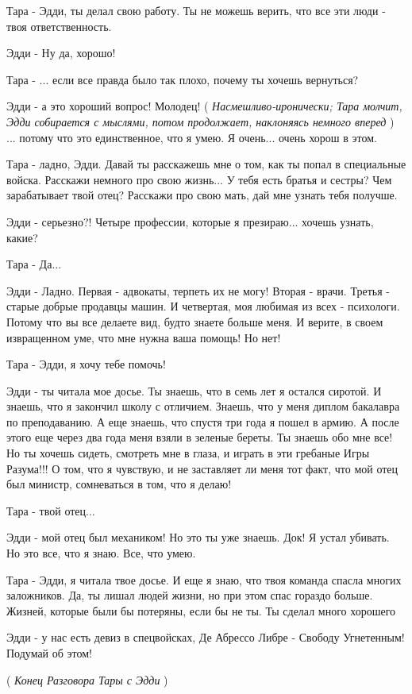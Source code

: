 Тара - Эдди, ты делал свою работу. Ты не можешь верить, что все эти люди - твоя
ответственность.

Эдди - Ну да, хорошо!

Тара - ... если все правда было так плохо, почему ты хочешь вернуться? 

Эдди - а это хороший вопрос! Молодец! ( \emph{Насмешливо-иронически; Тара
молчит, Эдди собирается с мыслями, потом продолжает, наклоняясь немного вперед}
) ... потому что это единственное, что я умею. Я очень...  очень хорош в этом. 

Тара - ладно, Эдди. Давай ты расскажешь мне о том, как ты попал в специальные
войска. Расскажи немного про свою жизнь... У тебя есть братья и сестры? Чем
зарабатывает твой отец? Расскажи про свою мать, дай мне узнать тебя получше. 

Эдди - серьезно?!  Четыре профессии, которые я презираю... хочешь узнать, какие?

Тара - Да...
 
Эдди - Ладно. Первая - адвокаты, терпеть их не могу! Вторая - врачи. Третья -
старые добрые продавцы машин.  И четвертая, моя любимая из всех - психологи.
Потому что вы все делаете вид, будто знаете больше меня. И верите, в своем
извращенном уме, что мне нужна ваша помощь! Но нет!

Тара - Эдди, я хочу тебе помочь!

Эдди - ты читала мое досье. Ты знаешь, что в семь лет я остался сиротой. И
знаешь, что я закончил школу с отличием. Знаешь, что у меня диплом бакалавра по
преподаванию. А еще знаешь, что спустя три года я пошел в армию. А после этого
еще через два года меня взяли в зеленые береты. Ты знаешь обо мне все! Но ты
хочешь сидеть, смотреть мне в глаза, и играть в эти гребаные Игры Разума!!! О
том, что я чувствую, и не заставляет ли меня тот факт, что мой отец был
министр, сомневаться в том, что я делаю!

Тара - твой отец...

Эдди - мой отец был механиком! Но это ты уже знаешь. Док! Я устал убивать. Но
это все, что я знаю. Все, что умею.

Тара - Эдди, я читала твое досье. И еще я знаю, что твоя команда спасла многих
заложников. Да, ты лишал людей жизни, но при этом спас гораздо больше. Жизней,
которые были бы потеряны, если бы не ты. Ты сделал много хорошего

Эдди - у нас есть девиз в спецвойсках, Де Абрессо Либре - Свободу Угнетенным!
Подумай об этом!

( \emph{Конец Разговора Тары с Эдди} )

